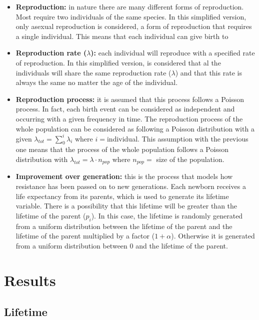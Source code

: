 \documentclass[conference]{IEEEtran}
\begin{document}
    \begin{itemize}
        \item \textbf{Reproduction:} in nature there are many different forms of reproduction. Most require two individuals of the same species.
        In this simplified version, only asexual reproduction is considered, a form of reproduction that requires a single individual.
        This means that each individual can give birth to
        \item \textbf{Reproduction rate ($\lambda$):} each individual will reproduce with a specified rate of reproduction. In this simplified version, is considered that al the individuals will share the same reproduction rate ($\lambda$) and that this rate is always the same no matter the age of the individual.
        \item \textbf{Reproduction process:} it is assumed that this process follows a Poisson process. In fact, each birth event can be considered as independent and occurring with a given frequency in time. The reproduction process of the whole population can be considered as following a Poisson distribution with a given $\lambda_{tot} = \sum_{0}^{i}\lambda_i$ where $i=$individual. This assumption with the previous one means that the process of the whole population follows a Poisson distribution with $\lambda_{tot} = \lambda \cdot {n}_{pop}$ where ${n}_{pop}=$ size of the population. 
        \item \textbf{Improvement over generation:} this is the process that models how resistance has been passed on to new generations. Each newborn receives a life expectancy from its parents, which is used to generate its lifetime variable. There is a possibility that this lifetime will be greater than the lifetime of the parent ($p_i$). In this case, the lifetime is randomly generated from a uniform distribution between the lifetime of the parent and the lifetime of the parent multiplied by a factor ($1+\alpha$). Otherwise it is generated from a uniform distribution between 0 and the lifetime of the parent.
    \end{itemize}

\section{Results}

    \subsection{Lifetime}
\end{document}
